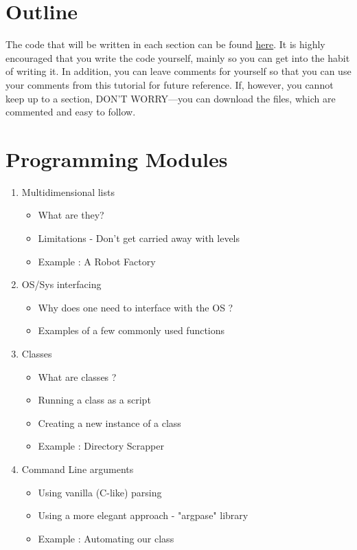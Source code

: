 \documentclass{article}
\begin{document}
\section{Outline}
The code that will be written in each section can be found \href{https://goo.gl/ZCDd6h}{here}. It is highly encouraged that you write the code yourself, mainly so you can get into the habit of writing it. In addition, you can leave comments for yourself so that you can use your comments from this tutorial for future reference. If, however, you cannot keep up to a section, DON'T WORRY—you can download the files, which are commented and easy to follow. 
 
\section{Programming Modules}
\begin{enumerate}
    \item Multidimensional lists
    \begin{itemize}
        \item What are they?
        \item Limitations - Don't get carried away with levels
        \item Example : A Robot Factory
    \end{itemize}
    \item OS/Sys interfacing
    \begin{itemize}
        \item Why does one need to interface with the OS ?
        \item Examples of a few commonly used functions
    \end{itemize}
    \item Classes
    \begin{itemize}
        \item What are classes ?
        \item Running a class as a script
        \item Creating a new instance of a class
        \item Example : Directory Scrapper
    \end{itemize}
    \item Command Line arguments
    \begin{itemize}
        \item Using vanilla (C-like) parsing
        \item Using a more elegant approach - "argpase" library
        \item Example : Automating our class
    \end{itemize}
\end{enumerate}
\end{document}
